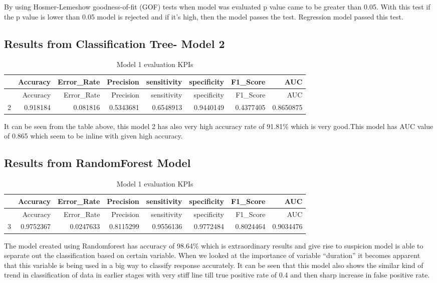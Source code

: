 \documentclass[english,floatsintext,man]{apa6}
\begin{document}
By using Hosmer-Lemeshow goodness-of-fit (GOF) tests when model was
evaluated p value came to be greater than 0.05. With this test if the p
value is lower than 0.05 model is rejected and if it's high, then the
model passes the test. Regression model passed this test.

\subsection{Results from Classification Tree- Model
2}\label{results-from-classification-tree--model-2}

\begin{longtable}[c]{@{}lrrrrrrr@{}}
\caption{Model 1 evaluation KPIs}\tabularnewline
\toprule
& Accuracy & Error\_Rate & Precision & sensitivity & specificity &
F1\_Score & AUC\tabularnewline
\midrule
\endfirsthead
\toprule
& Accuracy & Error\_Rate & Precision & sensitivity & specificity &
F1\_Score & AUC\tabularnewline
\midrule
\endhead
2 & 0.918184 & 0.081816 & 0.5343681 & 0.6548913 & 0.9440149 & 0.4377405
& 0.8650875\tabularnewline
\bottomrule
\end{longtable}

It can be seen from the table above, this model 2 has also very high
accuracy rate of 91.81\% which is very good.This model has AUC value of
0.865 which seem to be inline with given high accuracy.

\subsection{Results from RandomForest
Model}\label{results-from-randomforest-model}

\begin{longtable}[c]{@{}lrrrrrrr@{}}
\caption{Model 1 evaluation KPIs}\tabularnewline
\toprule
& Accuracy & Error\_Rate & Precision & sensitivity & specificity &
F1\_Score & AUC\tabularnewline
\midrule
\endfirsthead
\toprule
& Accuracy & Error\_Rate & Precision & sensitivity & specificity &
F1\_Score & AUC\tabularnewline
\midrule
\endhead
3 & 0.9752367 & 0.0247633 & 0.8115299 & 0.9556136 & 0.9772484 &
0.8024464 & 0.9034476\tabularnewline
\bottomrule
\end{longtable}

The model created using Randomforest has accuracy of 98.64\% which is
extraordinary results and give rise to suspicion model is able to
separate out the classification based on certain variable. When we
looked at the importance of variable \enquote{duration} it becomes
apparent that this variable is being used in a big way to classify
response accurately. It can be seen that this model also shows the
similar kind of trend in classification of data in earlier stages with
very stiff line till true positive rate of 0.4 and then sharp increase
in false positive rate.
\end{document}
